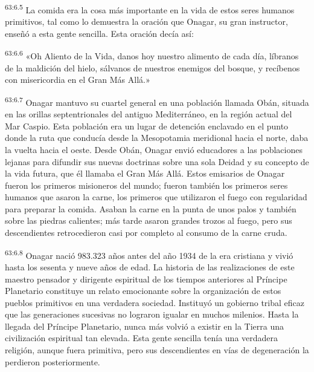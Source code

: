 \par
\textsuperscript{63:6.5} La comida era la cosa más importante en la vida de estos seres humanos primitivos, tal como lo demuestra la oración que Onagar, su gran instructor, enseñó a esta gente sencilla. Esta oración decía así:

\par
\textsuperscript{63:6.6} «Oh Aliento de la Vida, danos hoy nuestro alimento de cada día, líbranos de la maldición del hielo, sálvanos de nuestros enemigos del bosque, y recíbenos con misericordia en el Gran Más Allá.»

\par
\textsuperscript{63:6.7} Onagar mantuvo su cuartel general en una población llamada Obán, situada en las orillas septentrionales del antiguo Mediterráneo, en la región actual del Mar Caspio. Esta población era un lugar de detención enclavado en el punto donde la ruta que conducía desde la Mesopotamia meridional hacia el norte, daba la vuelta hacia el oeste. Desde Obán, Onagar envió educadores a las poblaciones lejanas para difundir sus nuevas doctrinas sobre una sola Deidad y su concepto de la vida futura, que él llamaba el Gran Más Allá. Estos emisarios de Onagar fueron los primeros misioneros del mundo; fueron también los primeros seres humanos que asaron la carne, los primeros que utilizaron el fuego con regularidad para preparar la comida. Asaban la carne en la punta de unos palos y también sobre las piedras calientes; más tarde asaron grandes trozos al fuego, pero sus descendientes retrocedieron casi por completo al consumo de la carne cruda.

\par
\textsuperscript{63:6.8} Onagar nació 983.323 años antes del año 1934 de la era cristiana y vivió hasta los sesenta y nueve años de edad. La historia de las realizaciones de este maestro pensador y dirigente espiritual de los tiempos anteriores al Príncipe Planetario constituye un relato emocionante sobre la organización de estos pueblos primitivos en una verdadera sociedad. Instituyó un gobierno tribal eficaz que las generaciones sucesivas no lograron igualar en muchos milenios. Hasta la llegada del Príncipe Planetario, nunca más volvió a existir en la Tierra una civilización espiritual tan elevada. Esta gente sencilla tenía una verdadera religión, aunque fuera primitiva, pero sus descendientes en vías de degeneración la perdieron posteriormente.

